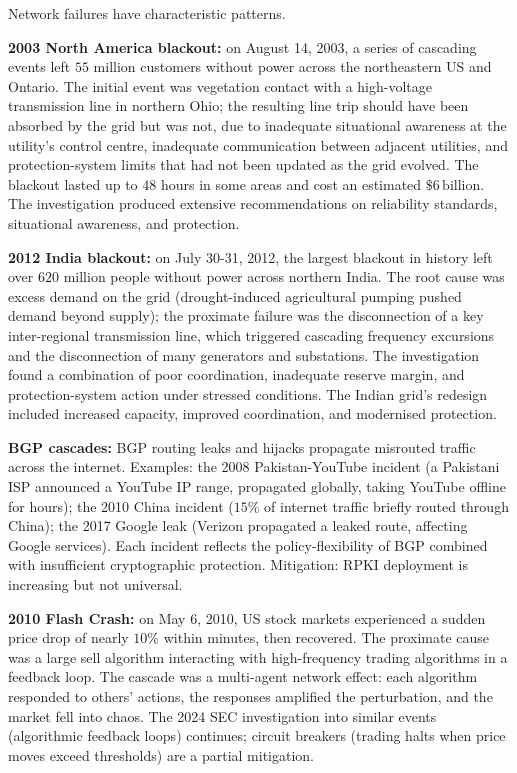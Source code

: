 Network failures have characteristic patterns.

\textbf{2003 North America blackout:} on August 14, 2003, a series of cascading events left $55$ million customers without power across the northeastern US and Ontario. The initial event was vegetation contact with a high-voltage transmission line in northern Ohio; the resulting line trip should have been absorbed by the grid but was not, due to inadequate situational awareness at the utility's control centre, inadequate communication between adjacent utilities, and protection-system limits that had not been updated as the grid evolved. The blackout lasted up to $48$ hours in some areas and cost an estimated $\$6\,\text{billion}$. The investigation produced extensive recommendations on reliability standards, situational awareness, and protection.

\textbf{2012 India blackout:} on July 30-31, 2012, the largest blackout in history left over $620$ million people without power across northern India. The root cause was excess demand on the grid (drought-induced agricultural pumping pushed demand beyond supply); the proximate failure was the disconnection of a key inter-regional transmission line, which triggered cascading frequency excursions and the disconnection of many generators and substations. The investigation found a combination of poor coordination, inadequate reserve margin, and protection-system action under stressed conditions. The Indian grid's redesign included increased capacity, improved coordination, and modernised protection.

\textbf{BGP cascades:} BGP routing leaks and hijacks propagate misrouted traffic across the internet. Examples: the 2008 Pakistan-YouTube incident (a Pakistani ISP announced a YouTube IP range, propagated globally, taking YouTube offline for hours); the 2010 China incident ($15\%$ of internet traffic briefly routed through China); the 2017 Google leak (Verizon propagated a leaked route, affecting Google services). Each incident reflects the policy-flexibility of BGP combined with insufficient cryptographic protection. Mitigation: RPKI deployment is increasing but not universal.

\textbf{2010 Flash Crash:} on May 6, 2010, US stock markets experienced a sudden price drop of nearly $10\%$ within minutes, then recovered. The proximate cause was a large sell algorithm interacting with high-frequency trading algorithms in a feedback loop. The cascade was a multi-agent network effect: each algorithm responded to others' actions, the responses amplified the perturbation, and the market fell into chaos. The 2024 SEC investigation into similar events (algorithmic feedback loops) continues; circuit breakers (trading halts when price moves exceed thresholds) are a partial mitigation.

